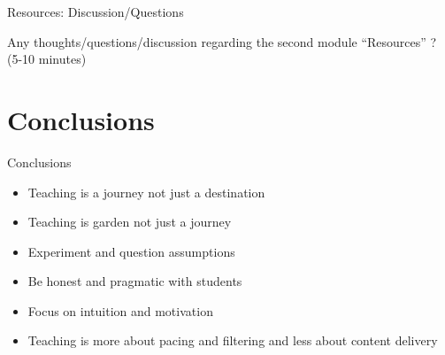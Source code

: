 \documentclass[12pt]{beamer}
\begin{document}
\begin{frame}{Resources: Discussion/Questions}

  Any thoughts/questions/discussion regarding the second module ``Resources'' ? (5-10 minutes) 
  
\end{frame}



\section{Conclusions}

\begin{frame}{Conclusions}

  \begin{itemize}
  \item Teaching is a journey not just a destination
  \item Teaching is garden not just a journey
  \item Experiment and question assumptions
  \item Be honest and pragmatic with students
  \item Focus on intuition and motivation
  \item Teaching is more about pacing and filtering and less about content delivery
  \end{itemize} 
\end{frame}
  




 
\end{document}

